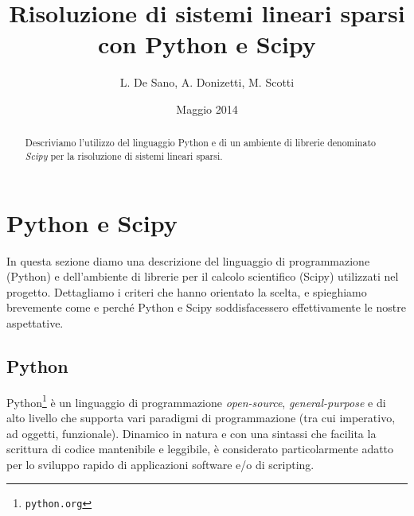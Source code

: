 \documentclass[11pt,a4paper]{scrartcl}
\author{L. De Sano, A. Donizetti, M. Scotti}
\title{Risoluzione di sistemi lineari sparsi \\con Python e Scipy}
\date{Maggio 2014}
\begin{document}
\maketitle
\begin{abstract}
Descriviamo l'utilizzo del linguaggio Python e di un ambiente di librerie denominato \emph{Scipy} per la risoluzione di sistemi lineari sparsi.
\end{abstract}

\section*{Python e Scipy}

In questa sezione diamo una descrizione del linguaggio di programmazione (Python) e dell'ambiente di librerie per il calcolo scientifico (Scipy) utilizzati nel progetto. Dettagliamo i criteri che hanno orientato la scelta, e spieghiamo brevemente come e perché Python e Scipy soddisfacessero effettivamente le nostre aspettative.

\subsection*{Python}

Python\footnote{\texttt{python.org}} è un linguaggio di programmazione \emph{open-source}, \emph{general-purpose} e di alto livello che supporta vari paradigmi di programmazione (tra cui imperativo, ad oggetti, funzionale). Dinamico in natura e con una sintassi che facilita la scrittura di codice mantenibile e leggibile, è considerato particolarmente adatto per lo sviluppo rapido di applicazioni software e/o di scripting.
\end{document}
